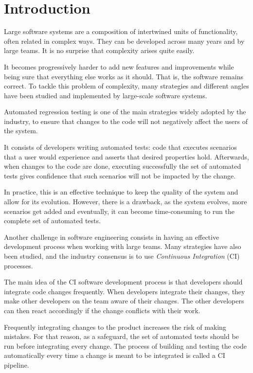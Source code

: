 \chapter{Introduction}

Large software systems are a composition of intertwined units of functionality,
often related in complex ways. They can be developed across many years and by 
large teams. It is no surprise that complexity arises quite easily. 

It becomes progressively harder to add new features and improvements while being 
sure that everything else works as it should. That is, the software remains
correct. To tackle this problem of complexity, many strategies and different 
angles have been studied and implemented by large-scale software systems. 

Automated regression testing is one of the main strategies widely adopted by the industry,
to ensure that changes to the code will not negatively affect the users of the system. 

It consists of developers writing automated tests: code that executes scenarios that a user would experience
and asserts that desired properties hold. Afterwards, when changes to the code are done,
executing successfully the set of automated tests gives confidence that such scenarios will
not be impacted by the change.

In practice, this is an effective technique to keep the quality of the system and
allow for its evolution. However, there is a drawback, as the system evolves, more
scenarios get added and eventually, it can become time-consuming to run the complete
set of automated tests.

Another challenge in software engineering consists in having an effective development process when
working with large teams. Many strategies have also been studied, and the industry 
consensus is to use \emph{Continuous Integration} (CI) processes.

The main idea of the CI software development process is that developers should
integrate code changes frequently. When developers integrate their changes,
they make other developers on the team aware of their changes. The other developers
can then react accordingly if the change conflicts with their work.

Frequently integrating changes to the product increases the risk of making mistakes.
For that reason, as a safeguard, the set of automated tests should be run before 
integrating every change. The process of building and testing the code automatically
every time a change is meant to be integrated is called a CI pipeline.

